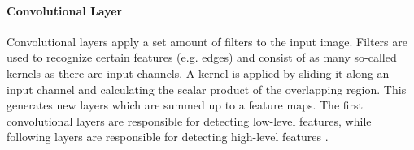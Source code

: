 \paragraph{Convolutional Layer}
Convolutional layers apply a set amount of filters to the input image.
Filters are used to recognize certain features (e.g. edges) and consist of as many so-called kernels as there are input channels.
A kernel is applied by sliding it along an input channel and calculating the scalar product of the overlapping region.
This generates new layers which are summed up to a feature maps.
The first convolutional layers are responsible for detecting low-level features, while following layers are responsible for detecting high-level features \cite[p.~327--330]{dl}.

